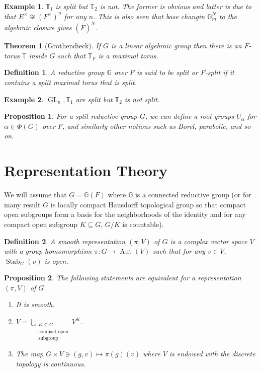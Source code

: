 \documentclass[10pt]{article}
\newtheorem{theorem}{Theorem} [section]
\newtheorem{proposition}{Proposition}[section]
\newtheorem{definition}{Definition}[section]
\newtheorem{example}{Example}[section]
\numberwithin{equation}{theorem}
\DeclareMathOperator{\Aut}{Aut}
\DeclareMathOperator{\Stab}{Stab}
\DeclareMathOperator{\GL}{GL}
\newcommand{\G}[0]{\mathbb{G}}
\newcommand{\bT}[0]{\mathbb{T}}
\begin{document}
\begin{example}
    $\bT_1$ is split but $\bT_2$ is not. The former is obvious and latter is due to that $E^\times\not\cong (F^\times)^n$ for any $n$. This is also seen that base changin $\G_m^N$ to the algebraic closure gives $(\overline{F})^N$.
\end{example}

\begin{theorem}[Grothendieck]
    If $G$ is a linear algebraic group then there is an $F$-torus $\bT$ inside $G$ such that $\bT_{\overline{F}}$ is a maximal torus.
\end{theorem}

\begin{definition}
    A reductive group $\G$ over $F$ is said to be split or $F$-split if it contains a split maximal torus that is split.
\end{definition}

\begin{example}
    $\GL_n,\bT_1$ are split but $\bT_2$ is not split.
\end{example}

\begin{proposition}
    For a split reductive group $G$, we can define a root groups $U_\alpha$ for $\alpha\in\Phi(G)$ over $F$, and similarly other notions such as Borel, parabolic, and so on.
\end{proposition}


\section{Representation Theory}
We will assume that $G=\G(F)$ where $\G$ is a connected reductive group (or for many result $G$ is locally compact Hausdorff topological group so that compact open subgroups form a basis for the neighborhoods of the identity and for any compact open subgroup $K\subseteq G$, $G/K$ is countable).

\begin{definition}
    \label{definition_3_1}
    A smooth representation $(\pi,V)$ of $G$ is a complex vector space $V$ with a group homomorphism $\pi:G\to \Aut(V)$ such that for any $v\in V$, $\Stab_G(v)$ is open.
\end{definition}

\begin{proposition}
    The following statements are equivalent for a representation $(\pi,V)$ of $G$.
    \begin{enumerate}[1.]
        \item It is smooth.
        \item $V = \bigcup_{\substack{K\subseteq G\\\text{compact open}\\\text{subgroup}}}V^K$.
        \item The map $G\times V\ni (g,v)\mapsto\pi(g)(v)$ where $V$ is endowed with the discrete topology is continuous.
    \end{enumerate}
\end{proposition}
\end{document}

